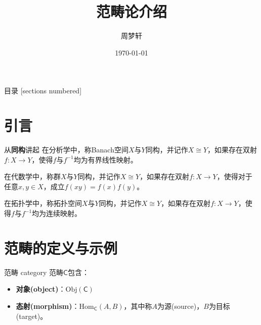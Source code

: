 \documentclass{beamer}
\title{范畴论介绍}
\date{\today}
\author{周梦轩}
\institute{河北工业大学}
\begin{document}
\maketitle

\begin{frame}{目录}
	[sections numbered]
	\tableofcontents[hideallsubsections]
\end{frame}


\section{引言}

\begin{frame}{从{\bf 同构}讲起}
	在分析学中，称Banach空间$X$与$Y$同构，并记作$X\cong Y$，如果存在双射$f:X\to Y$，使得$f$与$f^{-1}$均为有界线性映射。
	
	在代数学中，称群$X$与$Y$同构，并记作$X\cong Y$，如果存在双射$f:X\to Y$，使得对于任意$x,y\in X$，成立$f(xy)=f(x)f(y)$。
	
	在拓扑学中，称拓扑空间$X$与$Y$同构，并记作$X\cong Y$，如果存在双射$f:X\to Y$，使得$f$与$f^{-1}$均为连续映射。
\end{frame}

\section{范畴的定义与示例}

\begin{frame}{范畴 category}
	范畴$\mathsf{C}$包含：
	\begin{itemize}
		\item {\bf 对象(object)}：$\mathrm{Obj}(\mathsf{C})$
		\item {\bf 态射(morphism)}：$\mathrm{Hom}_\mathsf{C}(A,B)$，其中称$A$为源(source)，$B$为目标(target)。
	\end{itemize}
\end{frame}
\end{document}
